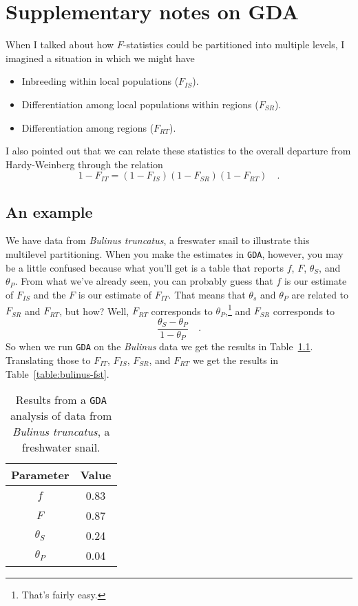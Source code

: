 \chapter{Supplementary notes on GDA}

When I talked about how $F$-statistics could be partitioned into
multiple levels, I imagined a situation in which we might have

\begin{itemize}

\item Inbreeding within local populations ($F_{IS}$).

\item Differentiation among local populations within regions
  ($F_{SR}$).

\item Differentiation among regions ($F_{RT}$).

\end{itemize}

\noindent I also pointed out that we can relate these statistics to
the overall departure from Hardy-Weinberg through the relation
\[
1-F_{IT} = (1-F_{IS})(1-F_{SR})(1-F_{RT}) \quad .
\]

\section*{An example}

We have data from {\it Bulinus truncatus\/}, a freswater snail to
illustrate this multilevel partitioning. When you make the estimates
in {\tt GDA}, however, you may be a little confused because what
you'll get is a table that reports $f$, $F$, $\theta_S$, and
$\theta_P$. From what we've already seen, you can probably guess that
$f$ is our estimate of $F_{IS}$ and the $F$ is our estimate of
$F_{IT}$. That means that $\theta_s$ and $\theta_P$ are related to
$F_{SR}$ and $F_{RT}$, but how? Well, $F_{RT}$ corresponds to
$\theta_P$,\footnote{That's fairly easy.} and $F_{SR}$ corresponds to 
\[
\frac{\theta_S - \theta_P}{1 - \theta_P} \quad .
\]
So when we run {\tt GDA} on the {\it Bulinus\/} data we get the
results in Table~\ref{table:bulinus-gda}. Translating those to
$F_{IT}$, $F_{IS}$, $F_{SR}$, and $F_{RT}$ we get the results in
Table~\ref{table:bulinus-fst}.

\begin{table}
\begin{center}
\begin{tabular}{cc}
\hline\hline
Parameter  & Value \\
\hline
$f$        & 0.83 \\
$F$        & 0.87 \\
$\theta_S$ & 0.24 \\
$\theta_P$ & 0.04 \\
\hline
\end{tabular}
\end{center}
\caption{Results from a {\tt GDA} analysis of data from {\it Bulinus
    truncatus}, a freshwater snail.}\label{table:bulinus-gda}
\end{table}

